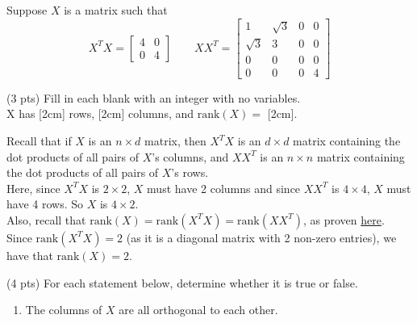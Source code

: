 \documentclass[11pt]{article}
\begin{document}
\newpage

\begin{prob}[(14 pts)]
Suppose $X$ is a matrix such that
\[
X^TX =
\begin{bmatrix}
4 & 0\\
0 & 4
\end{bmatrix}
\qquad
XX^T =
\begin{bmatrix}
1 & \sqrt{3} & 0 & 0 \\
\sqrt{3} & 3 & 0 & 0 \\
0 & 0 & 0 & 0 \\
0 & 0 & 0 & 4
\end{bmatrix}
\]

\begin{subprob}(3 pts)
Fill in each blank with an integer with no variables. \\

X has [2cm] rows, [2cm] columns, and $\text{rank}(X) =$ [2cm].

\begin{solution}
Recall that if $X$ is an $n \times d$ matrix, then $X^T X$ is an $d \times d$ matrix containing the dot products of all pairs of $X$'s columns, and $XX^T$ is an $n \times n$ matrix containing the dot products of all pairs of $X$'s rows. \\

Here, since $X^T X$ is $2 \times 2$, $X$ must have 2 columns and since $XX^T$ is $4 \times 4$, $X$ must have 4 rows. So $X$ is $4 \times 2$. \\

Also, recall that $\text{rank}(X) = \text{rank}(X^T X) = \text{rank}(XX^T)$, as proven \href{https://notes.eecs245.org/matrices/null-space-rank-nullity/\#example-rank-of-x-tx}{here}. Since $\text{rank}(X^T X) = 2$ (as it is a diagonal matrix with 2 non-zero entries), we have that $\text{rank}(X)=2$.

\end{solution}

\end{subprob}

\begin{subprob}(4 pts)
For each statement below, determine whether it is true or false.

\begin{enumerate}[label=(\roman*)]
  \item The columns of $X$ are all orthogonal to each other.

   


\end{enumerate}
\end{subprob}
\end{prob}
\end{document}
